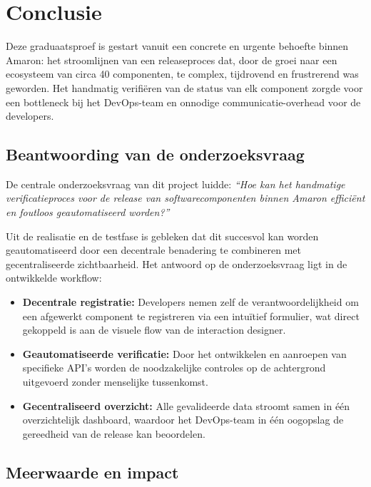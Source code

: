 
\chapter{Conclusie}%
\label{ch:conclusie}

Deze graduaatsproef is gestart vanuit een concrete en urgente behoefte binnen Amaron: het stroomlijnen van een releaseproces dat, door de groei naar een ecosysteem van circa 40 componenten, te complex, tijdrovend en frustrerend was geworden. Het handmatig verifiëren van de status van elk component zorgde voor een bottleneck bij het DevOps-team en onnodige communicatie-overhead voor de developers. 

\section{Beantwoording van de onderzoeksvraag}

De centrale onderzoeksvraag van dit project luidde: \textit{``Hoe kan het handmatige verificatieproces voor de release van softwarecomponenten binnen Amaron efficiënt en foutloos geautomatiseerd worden?''}

Uit de realisatie en de testfase is gebleken dat dit succesvol kan worden geautomatiseerd door een decentrale benadering te combineren met gecentraliseerde zichtbaarheid. Het antwoord op de onderzoeksvraag ligt in de ontwikkelde workflow:
\begin{itemize}
  \item \textbf{Decentrale registratie:} Developers nemen zelf de verantwoordelijkheid om een afgewerkt component te registreren via een intuïtief formulier, wat direct gekoppeld is aan de visuele flow van de interaction designer.
  \item \textbf{Geautomatiseerde verificatie:} Door het ontwikkelen en aanroepen van specifieke API's worden de noodzakelijke controles op de achtergrond uitgevoerd zonder menselijke tussenkomst.
  \item \textbf{Gecentraliseerd overzicht:} Alle gevalideerde data stroomt samen in één overzichtelijk dashboard, waardoor het DevOps-team in één oogopslag de gereedheid van de release kan beoordelen.
\end{itemize}

\section{Meerwaarde en impact}

